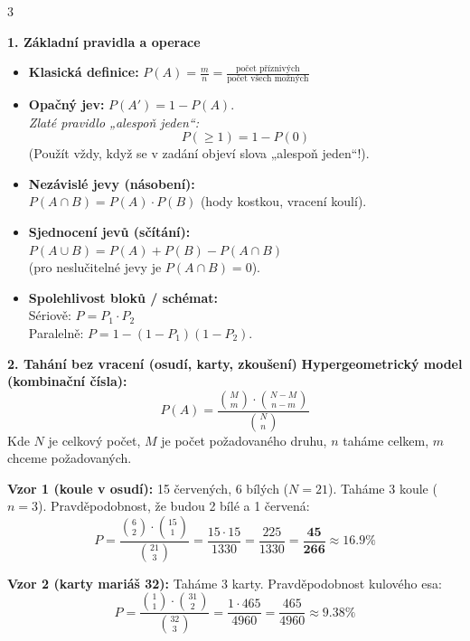 \documentclass[9pt,a4paper]{article}
\begin{document}
\begin{tcolorbox}[secbox,title=OKRUH 26: PRAVDĚPODOBNOST (KLASICKÁ, KOMBINAČNÍ, OPAČNÝ JEV, BERNOULLI)]
\begin{multicols}{3}

\textbf{1. Základní pravidla a operace}
\begin{itemize}
  \item \textbf{Klasická definice:} $P(A) = \frac{m}{n} = \frac{\text{počet příznivých}}{\text{počet všech možných}}$
  \item \textbf{Opačný jev:} $P(A') = 1 - P(A)$.\\
  \emph{Zlaté pravidlo „alespoň jeden“:}
  \[P(\ge 1) = 1 - P(0)\]
  (Použít vždy, když se v zadání objeví slova „alespoň jeden“!).
  \item \textbf{Nezávislé jevy (násobení):}\\
  $P(A \cap B) = P(A) \cdot P(B)$ (hody kostkou, vracení koulí).
  \item \textbf{Sjednocení jevů (sčítání):}\\
  $P(A \cup B) = P(A) + P(B) - P(A \cap B)$\\
  (pro neslučitelné jevy je $P(A \cap B) = 0$).
  \item \textbf{Spolehlivost bloků / schémat:}\\
  Sériově: $P = P_1 \cdot P_2$\\
  Paralelně: $P = 1 - (1 - P_1)(1 - P_2)$.
\end{itemize}

\columnbreak

\textbf{2. Tahání bez vracení (osudí, karty, zkoušení)}
\textbf{Hypergeometrický model (kombinační čísla):}
\[P(A) = \frac{\binom{M}{m} \cdot \binom{N - M}{n - m}}{\binom{N}{n}}\]
Kde $N$ je celkový počet, $M$ je počet požadovaného druhu, $n$ taháme celkem, $m$ chceme požadovaných.

\textbf{Vzor 1 (koule v osudí):}
15 červených, 6 bílých ($N=21$). Taháme 3 koule ($n=3$). Pravděpodobnost, že budou 2 bílé a 1 červená:
\[P = \frac{\binom{6}{2} \cdot \binom{15}{1}}{\binom{21}{3}} = \frac{15 \cdot 15}{1330} = \frac{225}{1330} = \frac{\mathbf{45}}{\mathbf{266}} \approx \mathbf{16.9\%}\]

\textbf{Vzor 2 (karty mariáš 32):}
Taháme 3 karty. Pravděpodobnost kulového esa:
\[P = \frac{\binom{1}{1} \cdot \binom{31}{2}}{\binom{32}{3}} = \frac{1 \cdot 465}{4960} = \frac{465}{4960} \approx \mathbf{9.38\%}\]


\end{multicols}
\end{tcolorbox}
\end{document}
